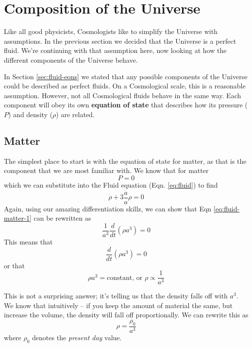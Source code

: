 \documentclass[11pt,a4paper,notoc]{tufte-handout}
\begin{document}
\hypertarget{ch:constituents}{%
\section{Composition of the Universe}\label{ch:constituents}}

Like all good physicists, Cosmologists like to simplify the Universe
with assumptions. In the previous section we decided that the Universe
is a perfect fluid. We're continuing with that assumption here, now
looking at how the different components of the Universe behave.

In Section \ref{sec:fluid-eqns} we stated that any possible components of
the Universe could be described as perfect fluids. On a Cosmological
scale, this is a reasonable assumption. However, not all Cosmological
fluids behave in the same way. Each component will obey its own
\textbf{equation of state} that describes how its pressure (\(P\)) and density
(\(\rho\)) are related.

\hypertarget{sec:matter-eos}{%
\subsection{Matter}\label{sec:matter-eos}}

The simplest place to start is with the equation of state for matter, as
that is the component that we are most familiar with. We know that for
matter \[P = 0\] which we can substitute into the Fluid equation (Eqn. \eqref{eq:fluid}) to find
\begin{equation}
    \dot{\rho} + 3\dfrac{\dot{a}}{a}\rho = 0
\label{eq:fluid-matter-1}
\end{equation}
Again, using our amazing
differentiation skillz, we can show that Eqn \eqref{eq:fluid-matter-1} can be rewritten as
\begin{equation}
\dfrac{1}{a^3}\dfrac{d}{dt}\left(\rho a^3\right) = 0
\label{eq:fluid-matter-2}
\end{equation}
This means that
\begin{equation}
\dfrac{d}{dt}\left(\rho a^3\right) = 0
\label{eq:fluid-matter-2}
\end{equation}
or that
\begin{equation}
    \rho a^3 = \text{constant,} \text{ or }\rho \propto \dfrac{1}{a^3}
    \label{eq:fluid-matter-3}
\end{equation}

This is not a surprising answer; it's telling us that the density falls
off with \(a^3\). We know that intuitively -- if you keep the amount of
material the same, but increase the volume, the density will fall off
proportionally. We can rewrite this as
\begin{equation}
\rho = \dfrac{\rho_0}{a^3}
\label{eq:fluid-matter-4}
\end{equation}
where \(\rho_0\) denotes the \emph{present day} value.
\end{document}

